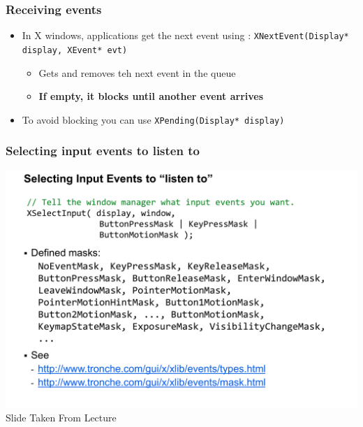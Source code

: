 \documentclass[twoside]{article}
\begin{document}
\subsubsection{Receiving events}
\begin{itemize}
\item In X windows, applications get the next event using : \verb|XNextEvent(Display* display, XEvent* evt)|
\begin{itemize}
\item Gets and removes teh next event in the queue 
\item \textbf{If empty, it blocks until another event arrives}
\end{itemize}
\item To avoid blocking you can use \verb|XPending(Display* display)|
\end{itemize}

\subsubsection{Selecting input events to listen to}
\begin{center}
\includegraphics[scale=0.3]{6}\\
Slide Taken From Lecture
\end{center}
\newpage 
\end{document}
